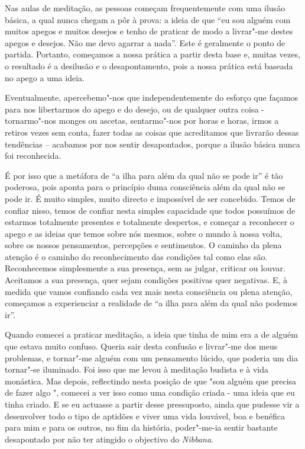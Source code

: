 Nas aulas de meditação, as pessoas começam frequentemente com uma ilusão
básica, a qual nunca chegam a pôr à prova: a ideia de que ``eu sou
alguém com muitos apegos e muitos desejos e tenho de praticar de modo a
livrar"-me destes apegos e desejos. Não me devo agarrar a nada''. Este é
geralmente o ponto de partida. Portanto, começamos a nossa prática a
partir desta base e, muitas vezes, o resultado é a desilusão e o
desapontamento, pois a nossa prática está baseada no apego a uma ideia.

Eventualmente, apercebemo"-nos que independentemente do esforço que
façamos para nos libertarmos do apego e do desejo, ou de qualquer outra
coisa - tornarmo"-nos monges ou ascetas, sentarmo"-nos por horas e horas,
irmos a retiros vezes sem conta, fazer todas as coisas que acreditamos
que livrarão dessas tendências -- acabamos por nos sentir desapontados,
porque a ilusão básica nunca foi reconhecida.

É por isso que a metáfora de ``a ilha para além da qual não se pode ir''
é tão poderosa, pois aponta para o princípio duma consciência além da
qual não se pode ir. É muito simples, muito directo e impossível de ser
concebido. Temos de confiar nisso, temos de confiar nesta simples
capacidade que todos possuímos de estarmos totalmente presentes e
totalmente despertos, e começar a reconhecer o apego e as ideias que
temos sobre nós mesmos, sobre o mundo à nossa volta, sobre os nossos
pensamentos, percepções e sentimentos. O caminho da plena atenção é o
caminho do reconhecimento das condições tal como elas são. Reconhecemos
simplesmente a sua presença, sem as julgar, criticar ou louvar.
Aceitamos a sua presença, quer sejam condições positivas quer negativas.
E, à medida que vamos confiando cada vez mais nesta consciência ou plena
atenção, começamos a experienciar a realidade de ``a ilha para além da
qual não podemos ir''.

Quando comecei a praticar meditação, a ideia que tinha de mim era a de
alguém que estava muito confuso. Queria sair desta confusão e livrar"-me
dos meus problemas, e tornar"-me alguém com um pensamento lúcido, que
poderia um dia tornar"-se iluminado. Foi isso que me levou à meditação
budista e à vida monástica. Mas depois, reflectindo nesta posição de que
"sou alguém que precisa de fazer algo ", comecei a ver isso como uma
condição criada - uma ideia que eu tinha criado. E se eu actuasse a
partir desse pressuposto, ainda que pudesse vir a desenvolver todo o
tipo de aptidões e viver uma vida louvável, boa e benéfica para mim e
para os outros, no fim da história, poder"-me-ia sentir bastante
desapontado por não ter atingido o objectivo do \emph{Nibbana}.

